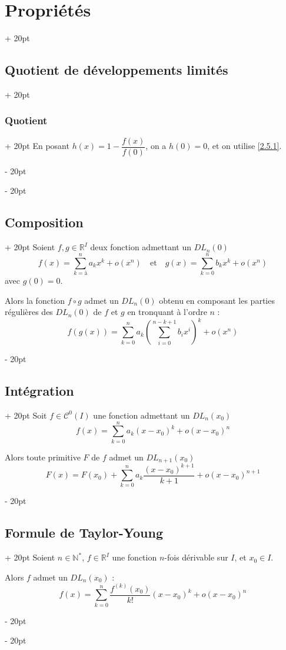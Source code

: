 \documentclass[a4paper, 12pt, twoside]{article}
\newcommand{\N}{\mathbb{N}} %
\newcommand{\R}{\mathbb{R}} %
\newcommand{\lr}[1]{\left( #1 \right)}
\newcommand{\ind}[1][20pt]{\advance\leftskip + #1}
\newcommand{\deind}[1][20pt]{\advance\leftskip - #1}
\newenvironment{indt}[2][20pt]{#2 \par \ind[#1]}{\par \deind} %
\begin{document}
\begin{indt}{\section{Propriétés}}
\begin{indt}{\subsection{Quotient de développements limités}}
\begin{indt}{\subsubsection{Quotient}}
                En posant $h(x) = 1 - \dfrac{f(x)}{f(0)}$, on a $h(0) = 0$, et on utilise \ref{2.5.1}.
            \end{indt}
            
        \end{indt}
        
        \vspace{12pt}
        
        \begin{indt}{\subsection{Composition}}
            Soient $f, g \in \R^I$ deux fonction admettant un $DL_n(0)$
                \[ f(x) = \sum_{k = à}^n a_k x^k + o(x^n) \quad \text{et} \quad g(x) = \sum_{k = 0}^n b_k x^k + o(x^n) \]
            avec $g(0) = 0$.
            
            Alors la fonction $f \circ g$ admet un $DL_n(0)$ obtenu en composant les parties régulières des $DL_n(0)$ de $f$ et $g$ en tronquant à l'ordre $n$ :
                \[ f(g(x)) = \sum_{k = 0}^n a_k \lr{\sum_{i = 0}^{n - k + 1} b_i x^i}^k + o(x^n) \]
        \end{indt}
        
        \vspace{12pt}
        
        \begin{indt}{\subsection{Intégration}}
            Soit $f \in \mathcal C^0(I)$ une fonction admettant un $DL_n(x_0)$
                \[ f(x) = \sum_{k = 0}^n a_k (x - x_0)^k + o(x - x_0)^n \]
            
            
            Alors toute primitive $F$ de $f$ admet un $DL_{n + 1}(x_0)$
                \[ F(x) = F(x_0) + \sum_{k = 0}^n a_k \dfrac{(x - x_0)^{k + 1}}{k + 1} + o(x - x_0)^{n + 1} \]
        \end{indt}
        
        \vspace{12pt}
        
        \begin{indt}{\subsection{Formule de Taylor-Young}}
            Soient $n \in \N^*$, $f \in \R^I$ une fonction $n$-fois dérivable sur $I$, et $x_0 \in I$.
            
            Alors $f$ admet un $DL_n(x_0)$ :
                \[ f(x) = \sum_{k = 0}^n \dfrac{f^{(k)}(x_0)}{k!} (x - x_0)^k + o(x - x_0)^n \]
        \end{indt}
        
    \end{indt}
    
\end{document}
